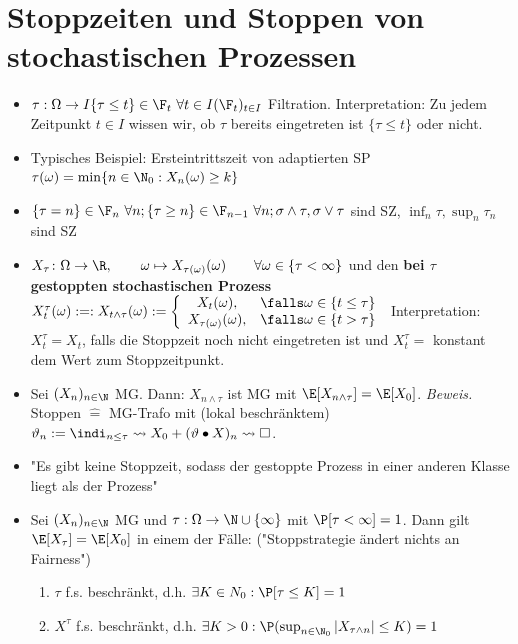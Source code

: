 	\section{Stoppzeiten und Stoppen von stochastischen Prozessen}
	\begin{itemize}
		\item {} $\tau:\Omega\to I\mit\lbrace \tau\leq t\rbrace\in\F_t~\forall t\in I\mit (\F_t)_{t\in I}$ Filtration.
		Interpretation: Zu jedem Zeitpunkt $t\in I$ wissen wir, ob $\tau$ bereits eingetreten ist $\lbrace\tau\leq t\rbrace$ oder nicht.
		\item Typisches Beispiel: Ersteintrittszeit von adaptierten SP $\tau(\omega)=\min\lbrace n\in\N_0:X_n(\omega)\geq k\rbrace$
		\item $\lbrace \tau=n\rbrace\in\F_n~\forall n;\lbrace \tau\geq n\rbrace\in\F_{n-1}~\forall n;\sigma\wedge\tau,\sigma\vee\tau$ sind SZ, $\inf_n\tau,\sup_n\tau_n$ sind SZ
		\item $X_\tau\colon\Omega\to\R,\qquad \omega\mapsto X_{\tau(\omega)}(\omega)\qquad\forall \omega\in\lbrace\tau<\infty\rbrace$
	und den \textbf{bei $\tau$ gestoppten stochastischen Prozess}
	$X_t^\tau(\omega):=:X_{t\wedge\tau}(\omega):=\left\lbrace\begin{array}{cl}
			X_t(\omega), & \falls \omega\in\lbrace t\leq\tau\rbrace\\
			X_{\tau(\omega)}(\omega), &\falls\omega\in\lbrace t>\tau\rbrace
		\end{array}\right.$
		Interpretation: $X_t^\tau=X_t$, falls die Stoppzeit noch nicht eingetreten ist und $X_t^\tau=$ konstant dem Wert zum Stoppzeitpunkt.
		\item Sei $(X_n)_{n\in\N}$ MG. Dann: $X_{n\wedge\tau}$ ist MG mit $\E[X_{n\wedge\tau}]=\E[X_0]$. \textit{Beweis.} Stoppen $\hat{=}$ MG-Trafo mit (lokal beschränktem) $\vartheta_{n}:=\indi_{n\leq\tau}\leadsto X_0+(\vartheta\bullet X)_n\leadsto\square$.
		\item "Es gibt keine Stoppzeit, sodass der gestoppte Prozess in einer anderen Klasse liegt als der Prozess" %
		\item {} Sei $(X_n)_{n\in\N}$ MG und $\tau:\Omega\to\N\cup\lbrace\infty\rbrace$ mit $\P[\tau<\infty]=1$. 
		Dann gilt $\E[X_\tau]=\E[X_0]$ in einem der Fälle: ("Stoppstrategie ändert nichts an Fairness")
		\begin{enumerate}
			\item $\tau$ f.s. beschränkt, d.h. $\exists K\in N_0:\P[\tau\leq K]=1$
			\item $X^\tau$ f.s. beschränkt, d.h. $\exists K>0:\P(\sup_{n\in\N_0}|X_{\tau\wedge n}|\leq K)=1$

\end{enumerate}
\end{itemize}
